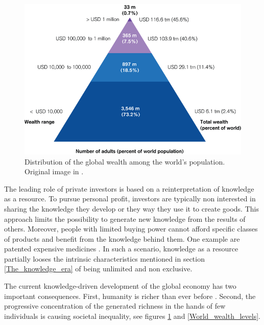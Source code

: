 \begin{figure}[!t] 
 \begin{center}
 \includegraphics[scale=0.42]{Images/Global_wealth_pyramid.png}
 \caption{Distribution of the global wealth among the world's population. Original image in \cite{Kersley}.}
 \label{Global_wealth_pyramid}
 \end{center}
\end{figure}

The leading role of private investors is based on a reinterpretation of knowledge as a resource. To pursue personal profit, investors are typically non interested in sharing the knowledge they develop or they way they use it to create goods. This approach limits the possibility to generate new knowledge from the results of others. Moreover, people with limited buying power cannot afford specific classes of products and benefit from the knowledge behind them. One example are patented expensive medicines \cite{Heller}. In such a scenario, knowledge as a resource partially looses the intrinsic characteristics mentioned in section \ref{The_knowledge_era} of being unlimited and non exclusive. 

The current knowledge-driven development of the global economy has two important consequences. First, humanity is richer than ever before \cite{Maddison}. Second, the progressive concentration of the generated richness in the hands of few individuals is causing societal inequality, see figures \ref{Global_wealth_pyramid} and \ref{World_wealth_levels}. 

